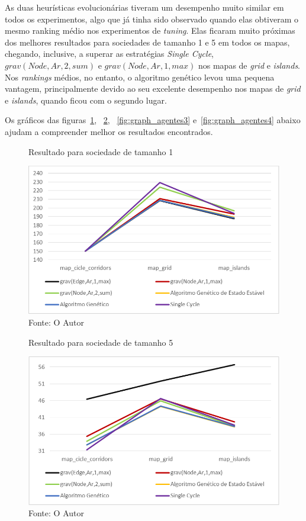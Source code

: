 As duas heurísticas evolucionárias tiveram um desempenho muito similar em 
todos os experimentos, algo que já tinha sido observado quando elas obtiveram 
o mesmo ranking médio nos experimentos de \textit{tuning}. Elas ficaram muito 
próximas dos melhores resultados para sociedades de tamanho 1 e 5 em todos os 
mapas, chegando, inclusive, a superar as estratégias \textit{Single Cycle}, 
$grav(Node,Ar,2,sum)$ e $grav(Node,Ar,1,max)$ nos mapas de \textit{grid} e 
\textit{islands}. Nos \textit{rankings} médios, no entanto, o 
algoritmo genético levou uma pequena vantagem, principalmente devido ao seu 
excelente desempenho nos mapas de \textit{grid} e \textit{islands}, quando 
ficou com o segundo lugar.

Os gráficos das figuras~\ref{fig:graph_agentes1}, ~\ref{fig:graph_agentes2}, 
~\ref{fig:graph_agentes3} e~\ref{fig:graph_agentes4} abaixo ajudam a 
compreender melhor os resultados encontrados.

\begin{figure}[b]
	\caption[Resultado para sociedade de tamanho 1]{Resultado para sociedade 
		de tamanho 1}
	\centering
	\includegraphics[width=\columnwidth]{images/graph_agent1.png}
	\caption*{Fonte: O Autor}
	\label{fig:graph_agentes1}
\end{figure}

\begin{figure}
	\caption[Resultado para sociedade de tamanho 5]{Resultado para sociedade 
		de tamanho 5}
	\centering
	\includegraphics[width=\columnwidth]{images/graph_agent2.png}
	\caption*{Fonte: O Autor}
	\label{fig:graph_agentes2}
\end{figure}

